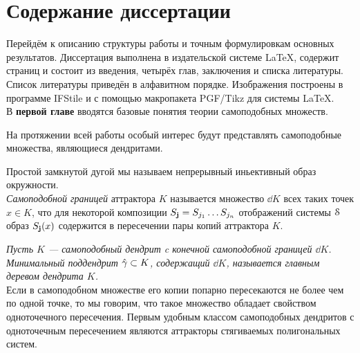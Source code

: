 \section{Содержание диссертации}

Перейдём к описанию структуры работы и точным формулировкам основных результатов.
Диссертация выполнена в издательской системе \LaTeX, содержит \red{\pageref{LastPage}} страниц и состоит из введения, четырёх глав, заключения и списка литературы.
Список литературы приведён в алфавитном порядке.
Изображения построены в программе IFStile \cite{IFStile} и с помощью макропакета PGF/Tikz для системы \LaTeX.\\


В \textbf{первой главе} вводятся базовые понятия теории самоподобных множеств.



На протяжении всей работы особый интерес будут представлять самоподобные множества, являющиеся дендритами. 


Простой замкнутой дугой мы называем непрерывный иньективный образ окружности.\\

{\em Самоподобной границей} аттрактора $K$ называется множество $\dd K$ всех таких точек $x\in K$, что для некоторой композиции $S_{\bf{j}}=S_{j_1}\ldots S_{j_n}$ отображений системы ${\EuScript S}$ образ $S_{\bf{j}}(x)$ содержится в пересечении пары копий аттрактора $K$.

{\em Пусть $K$ --- самоподобный дендрит c конечной самоподобной границей $\dd K$. 
Минимальный поддендрит $\hat\gamma\subset K$, содержащий $\dd K$, называется {\em главным деревом} дендрита $K$.}\\


Если в самоподобном множестве его копии попарно пересекаются не более чем по одной точке, то мы говорим, что такое множество обладает свойством одноточечного пересечения.
Первым удобным классом самоподобных дендритов с одноточечным пересечением являются аттракторы стягиваемых полигональных систем.

